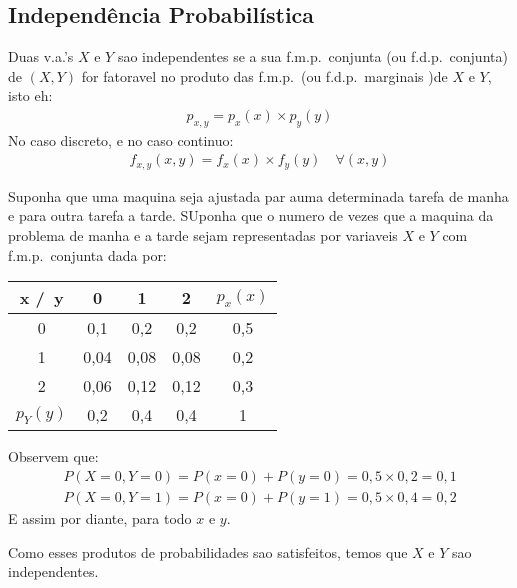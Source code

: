 \subsection{Independência Probabilística}
\begin{description}
  \item  Duas v.a.'s $X$ e $Y$ sao independentes se a sua f.m.p.\ conjunta (ou f.d.p.\ conjunta) de $(X,Y)$ for fatoravel no produto das f.m.p.\ (ou f.d.p.\ marginais )de $X$ e $Y$, isto eh:
  \begin{align}
    p_{x,y}  = p_{x}(x) \times p_{y}(y)
  \end{align}
  No caso discreto, e no caso continuo:
  \begin{align}
    f_{x,y} (x,y)= f_{x}(x) \times f_{y}(y) \quad \forall (x,y)
  \end{align}
 
\item [Exemplo:]  Suponha que uma maquina seja ajustada par auma determinada tarefa de manha e para outra tarefa a tarde. SUponha que o numero de vezes que a maquina da problema de manha e a tarde sejam representadas por variaveis  $X$ e $Y$ com f.m.p.\ conjunta dada por:
  \begin{table}[H]
    \centering
    \begin{tabular}{c c c c c}
      \toprule
      x /\ y & 0 & 1 & 2 &$p_{x}(x)$ \\ \midrule
      0 & 0,1 & 0,2 & 0,2& 0,5\\ \midrule
      1 & 0,04 & 0,08& 0,08&0,2 \\ \midrule
      2 & 0,06 & 0,12 & 0,12 & 0,3 \\ \midrule 
      $p_{Y} (y)$ & 0,2 & 0,4 &0,4 & 1 \bottomrule
      \bottomrule
    \end{tabular}
  \end{table}
  Observem que:
  \begin{align*}
    P(X=0, Y=0) = P(x=0) + P(y=0)= 0,5 \times 0,2 = 0,1
  \end{align*}
  \begin{align*}
    P(X=0, Y=1) = P(x=0) + P(y=1)= 0,5 \times 0,4 = 0,2
  \end{align*}
E assim por diante,  para todo $x$ e $y$.

Como esses produtos de probabilidades sao satisfeitos, temos que $X$ e $Y$ sao independentes.
\end{description}
